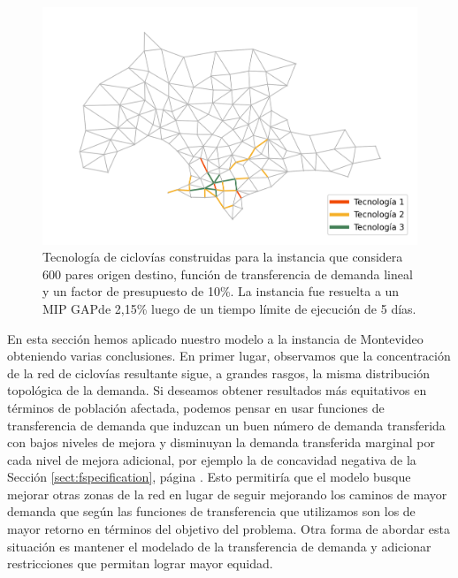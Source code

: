 \begin{figure}[h!]
  \centering
  \includegraphics[width=12cm]{../resources/montevideo_d3000.0_linear_0.1_budget_factor.png}
    \caption{Tecnología de ciclovías construidas para la instancia que considera 600 pares origen destino, función de transferencia de demanda lineal y un factor de presupuesto de 10\%. La instancia fue resuelta a un MIP GAP\protect\footnotemark de 2,15\% luego de un tiempo límite de ejecución de 5 días.}
  \label{fig:montevideolowbudgetinstance}
\end{figure}


\FloatBarrier
En esta sección hemos aplicado nuestro modelo a la instancia de Montevideo obteniendo varias conclusiones. En primer lugar, observamos que la concentración de la red de ciclovías resultante sigue, a grandes rasgos, la misma distribución topológica de la demanda. Si deseamos obtener resultados más equitativos en términos de población afectada, podemos pensar en usar funciones de transferencia de demanda que induzcan un buen número de demanda transferida con bajos niveles de mejora y disminuyan la demanda transferida marginal por cada nivel de mejora adicional, por ejemplo la de concavidad negativa de la Sección \ref{sect:fspecification}, página \pageref{sect:fspecification}. Esto permitiría que el modelo busque mejorar otras zonas de la red en lugar de seguir mejorando los caminos de mayor demanda que según las funciones de transferencia que utilizamos son los de mayor retorno en términos del objetivo del problema. Otra forma de abordar esta situación es mantener el modelado de la transferencia de demanda y adicionar restricciones que permitan lograr mayor equidad.

